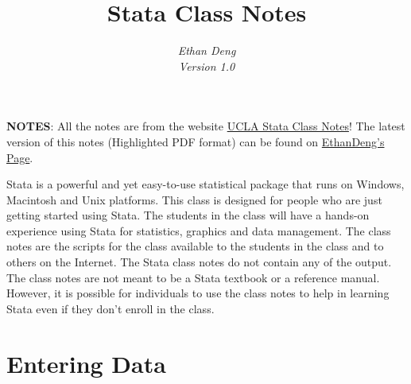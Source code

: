 \documentclass{article}
\title{\bfseries{\color{blue}Stata} {\color{magenta}Class Notes}}
\author{\Large\gara\itshape{{\color{blue}E}than {\color{magenta}D}eng} \\ Version 1.0}
\begin{document}
\maketitle
\noindent\textbf{NOTES}: All the notes are from the website \href{http://www.ats.ucla.edu/stat/stata/notes/default13.htm}{UCLA Stata Class Notes}! The latest version of this notes (Highlighted PDF format) can be found on \href{http://ddswhu.com/}{EthanDeng\rq{}s Page}.

Stata is a powerful and yet easy-to-use statistical package that runs on Windows, Macintosh and Unix platforms.  This class is designed for people who are just getting started using Stata.  The students in the class will have a hands-on experience using Stata for statistics, graphics and data management.  The class notes are the scripts for the class available to the students in the class and to others on the Internet.  The Stata class notes do not contain any of the output.  The class notes are not meant to be a Stata textbook or a reference manual.  However, it is possible for individuals to use the class notes to help in learning Stata even if they don't enroll in the class.

\section{Entering Data}
\end{document}
